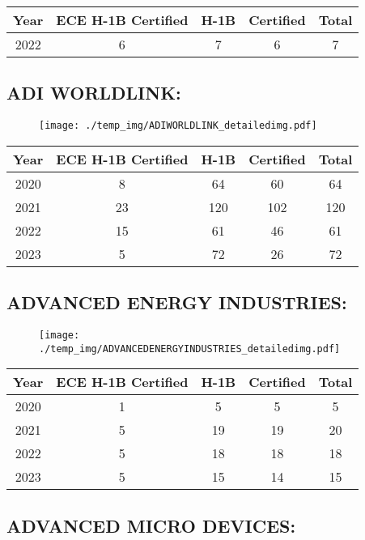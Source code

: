 \documentclass{article}%
\begin{document}
%
\begin{longtable}{c|c|c|c|c}%
\hline%
Year&ECE H{-}1B Certified&H{-}1B&Certified&Total\\%
\hline%
2022&6&7&6&7\\%
\hline%
\end{longtable}

%
\newpage%
\subsection{ADI WORLDLINK:}%
\label{subsec:ADIWORLDLINK}%
\label{ADIWORLDLINKdetailed}%


\begin{figure}[htbp]%
\centering%
\texttt{[image: ./temp\_img/ADIWORLDLINK\_detailedimg.pdf]}%
\end{figure}

%
\begin{longtable}{c|c|c|c|c}%
\hline%
Year&ECE H{-}1B Certified&H{-}1B&Certified&Total\\%
\hline%
2020&8&64&60&64\\%
\hline%
2021&23&120&102&120\\%
\hline%
2022&15&61&46&61\\%
\hline%
2023&5&72&26&72\\%
\hline%
\end{longtable}

%
\newpage%
\subsection{ADVANCED ENERGY INDUSTRIES:}%
\label{subsec:ADVANCEDENERGYINDUSTRIES}%
\label{ADVANCEDENERGYINDUSTRIESdetailed}%


\begin{figure}[htbp]%
\centering%
\texttt{[image: ./temp\_img/ADVANCEDENERGYINDUSTRIES\_detailedimg.pdf]}%
\end{figure}

%
\begin{longtable}{c|c|c|c|c}%
\hline%
Year&ECE H{-}1B Certified&H{-}1B&Certified&Total\\%
\hline%
2020&1&5&5&5\\%
\hline%
2021&5&19&19&20\\%
\hline%
2022&5&18&18&18\\%
\hline%
2023&5&15&14&15\\%
\hline%
\end{longtable}

%
\newpage%
\subsection{ADVANCED MICRO DEVICES:}%
\label{subsec:ADVANCEDMICRODEVICES}%
\label{ADVANCEDMICRODEVICESdetailed}%
\end{document}
